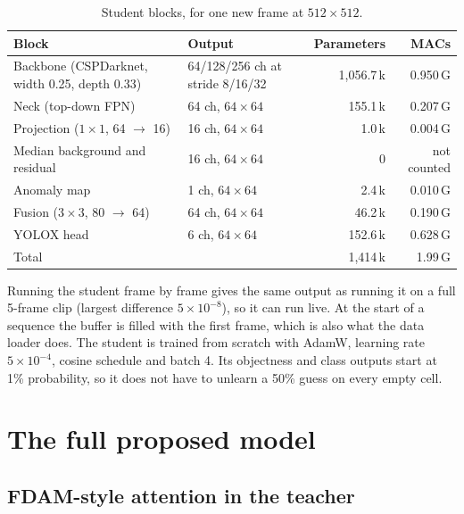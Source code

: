 \documentclass[11pt,a4paper]{article}
\begin{document}
\begin{table}[htbp]
\centering
\caption{Student blocks, for one new frame at $512\times512$.}
\label{tab:student}
\small
\begin{tabular}{llrr}
\toprule
Block & Output & Parameters & MACs \\
\midrule
Backbone (CSPDarknet, width 0.25, depth 0.33) & 64/128/256 ch at stride 8/16/32 & 1{,}056.7\,k & 0.950\,G \\
Neck (top-down FPN) & 64 ch, $64\times64$ & 155.1\,k & 0.207\,G \\
Projection ($1\times1$, 64 $\to$ 16) & 16 ch, $64\times64$ & 1.0\,k & 0.004\,G \\
Median background and residual & 16 ch, $64\times64$ & 0 & not counted \\
Anomaly map & 1 ch, $64\times64$ & 2.4\,k & 0.010\,G \\
Fusion ($3\times3$, 80 $\to$ 64) & 64 ch, $64\times64$ & 46.2\,k & 0.190\,G \\
YOLOX head & 6 ch, $64\times64$ & 152.6\,k & 0.628\,G \\
\midrule
Total & & 1{,}414\,k & 1.99\,G \\
\bottomrule
\end{tabular}
\end{table}

Running the student frame by frame gives the same output as running it on a full 5-frame clip (largest
difference $5\times10^{-8}$), so it can run live. At the start of a sequence the buffer is filled with the first
frame, which is also what the data loader does. The student is trained from scratch with AdamW, learning rate
$5\times10^{-4}$, cosine schedule and batch 4. Its objectness and class outputs start at 1\% probability, so it
does not have to unlearn a 50\% guess on every empty cell.

\section{The full proposed model}

\subsection{FDAM-style attention in the teacher}
\end{document}
